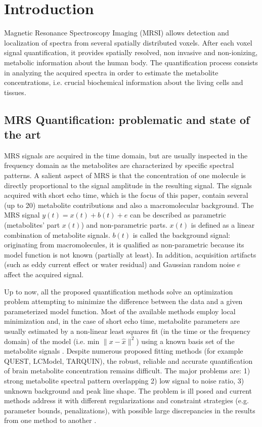 \documentclass{llncs}
\begin{document}
\section{Introduction}

Magnetic Resonance Spectroscopy Imaging (MRSI) allows detection and localization of spectra from several spatially distributed voxels. After each voxel signal quantification, it  provides spatially resolved, non invasive and non-ionizing, metabolic information about the human body. The quantification process consists in analyzing the acquired spectra in order to estimate the metabolite concentrations, i.e. crucial biochemical information about the living cells and tissues. 

\subsection{MRS Quantification: problematic and state of the art}


MRS signals are acquired in the time domain, but are usually inspected in the frequency domain as the metabolites are characterized by specific spectral patterns. A salient aspect of MRS is that the concentration of one molecule is directly proportional to the signal amplitude in the resulting signal. The signals acquired with short echo time, which is the focus of this paper, contain several (up to 20) metabolite contributions and also a macromolecular background. The MRS signal $y(t)= x(t) + b(t) + e$ can be described as parametric (metabolites' part $x(t)$) and non-parametric parts. $x(t)$ is defined as a linear combination of metabolite signals. $b(t)$  is called the background signal: originating from macromolecules, it is qualified as non-parametric because its model function is not known (partially at least). In addition, acquisition artifacts (such as eddy current effect or water residual) and Gaussian random noise $e$ affect the acquired signal.  

Up to now, all the proposed quantification methods solve an optimization problem attempting  to minimize the difference between the data and a given parameterized model function. Most of the available methods employ local minimization and, in the case of short echo time, metabolite parameters are usually estimated by a non-linear least squares fit (in the time or the frequency domain) of the model (i.e. min $\lVert x -\hat{x} \rVert ^{2}$) using a known basis set of the metabolite signals . Despite numerous proposed fitting methods (for example QUEST\cite{quest}, LCModel\cite{Provencher1993lcmodel}, TARQUIN\cite{Wilson2011tarquin}), the robust, reliable and accurate quantification of brain metabolite concentration remains difficult. The major problems are: 
1) strong metabolite spectral pattern overlapping %
2) low signal to noise ratio, 
3) unknown background and peak line shape.
The problem is ill posed and current methods address it with different regularizations and constraint strategies 
(e.g. parameter bounds, penalizations), with possible large discrepancies in the results from one method to another \cite{Bhogal_2017}. 
\end{document}
